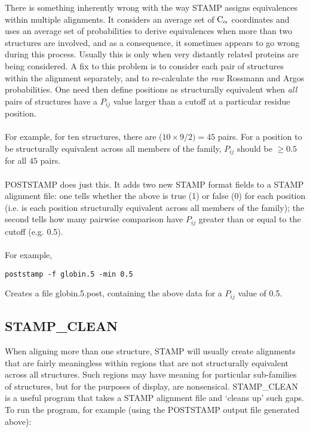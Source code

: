 There is something inherently wrong with the way STAMP assigns 
equivalences within multiple alignments.  It considers an average set of 
${\rm C}_{\alpha}$ coordinates and uses an average set of probabilities to derive 
equivalences when more than two structures are involved, and as a 
consequence, it sometimes appears to go wrong during this process.  
Usually this is only when very distantly related proteins are being 
considered.  A fix to this problem is to consider each pair of structures 
within the alignment separately, and to re-calculate the {\em raw} 
Rossmann and Argos probabilities.  One need then define positions as 
structurally equivalent when {\em all} pairs of structures have a 
$P_{ij}$ value larger than a cutoff at a particular residue position.\\
\\
For example, for ten structures, there are ($10 \times 9/2) = 45$ pairs.  
For a position to be structurally equivalent across all members of the 
family, $P_{ij}$ should be $ \geq 0.5$ for all $45$ pairs.  \\
\\
POSTSTAMP does just this.  It adds two new STAMP format fields to a STAMP
alignment file: one tells 
whether the above is true (1) or false (0) for each position (i.e. is 
each position structurally equivalent across all members of the family); 
the second tells how many pairwise comparison have $P_{ij}$ greater than 
or equal to the cutoff (e.g. 0.5).\\
\\
For example, \\

\begin{scriptsize}\begin{verbatim}
poststamp -f globin.5 -min 0.5
\end{verbatim} \end{scriptsize}

Creates a file globin.5.post, containing the above data for a $P_{ij}$ 
value of 0.5.\\

\subsection{STAMP\_CLEAN}

When aligning more than one structure, STAMP will usually create 
alignments that are fairly meaningless within regions that are not 
structurally equivalent across all structures.  Such regions may have 
meaning for particular sub-families of structures, but for the purposes 
of display, are nonsensical.  STAMP\_CLEAN is a useful program that 
takes a STAMP alignment file and `cleans up' such gaps.  To run the
program, for example (using the POSTSTAMP output file generated above):\\

